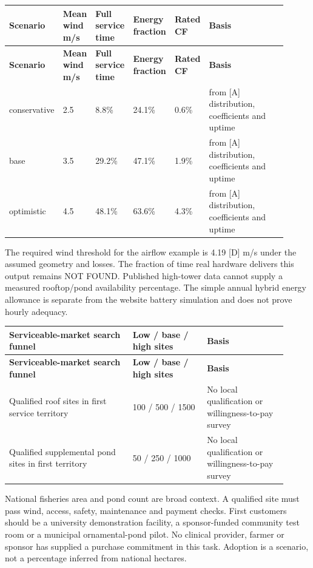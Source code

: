 \documentclass[11pt,a4paper]{article}
\begin{document}
{\small
\setlength{\tabcolsep}{3pt}\renewcommand{\arraystretch}{1.18}
\begin{longtable}{@{}>{\raggedright\arraybackslash}p{0.1628\linewidth}>{\raggedright\arraybackslash}p{0.1054\linewidth}>{\raggedright\arraybackslash}p{0.1245\linewidth}>{\raggedright\arraybackslash}p{0.1245\linewidth}>{\raggedright\arraybackslash}p{0.1054\linewidth}>{\raggedright\arraybackslash}p{0.2874\linewidth}@{}}
\toprule \textbf{Scenario} & \textbf{Mean wind m/s} & \textbf{Full service time} & \textbf{Energy fraction} & \textbf{Rated CF} & \textbf{Basis} \\ \midrule
\endfirsthead\toprule \textbf{Scenario} & \textbf{Mean wind m/s} & \textbf{Full service time} & \textbf{Energy fraction} & \textbf{Rated CF} & \textbf{Basis} \\ \midrule
\endhead\bottomrule\endfoot
conservative & \num{2.5} & \num{8.8}\% & \num{24.1}\% & \num{0.6}\% & [D] from [A] distribution, coefficients and uptime \\
base & \num{3.5} & \num{29.2}\% & \num{47.1}\% & \num{1.9}\% & [D] from [A] distribution, coefficients and uptime \\
optimistic & \num{4.5} & \num{48.1}\% & \num{63.6}\% & \num{4.3}\% & [D] from [A] distribution, coefficients and uptime \\
\end{longtable}}
The required wind threshold for the airflow example is \num{4.19} [D] m/s under the assumed geometry and losses. The fraction of time real hardware delivers this output remains NOT FOUND. Published high-tower data cannot supply a measured rooftop/pond availability percentage. The simple annual hybrid energy allowance is separate from the website battery simulation and does not prove hourly adequacy.

{\small
\setlength{\tabcolsep}{3pt}\renewcommand{\arraystretch}{1.18}
\begin{longtable}{@{}>{\raggedright\arraybackslash}p{0.4015\linewidth}>{\raggedright\arraybackslash}p{0.2409\linewidth}>{\raggedright\arraybackslash}p{0.2676\linewidth}@{}}
\toprule \textbf{Serviceable-market search funnel} & \textbf{Low / base / high sites} & \textbf{Basis} \\ \midrule
\endfirsthead\toprule \textbf{Serviceable-market search funnel} & \textbf{Low / base / high sites} & \textbf{Basis} \\ \midrule
\endhead\bottomrule\endfoot
Qualified roof sites in first service territory & \num{100} / \num{500} / \num{1500} & [A] No local qualification or willingness-to-pay survey \\
Qualified supplemental pond sites in first territory & \num{50} / \num{250} / \num{1000} & [A] No local qualification or willingness-to-pay survey \\
\end{longtable}}
National fisheries area and pond count are broad context. A qualified site must pass wind, access, safety, maintenance and payment checks. First customers should be a university demonstration facility, a sponsor-funded community test room or a municipal ornamental-pond pilot. No clinical provider, farmer or sponsor has supplied a purchase commitment in this task. Adoption is a scenario, not a percentage inferred from national hectares.
\end{document}
